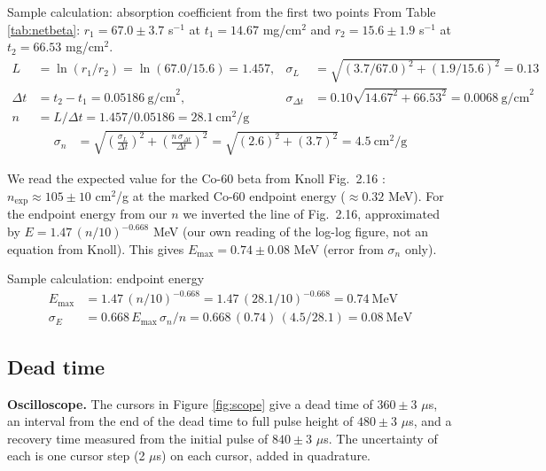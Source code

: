 \documentclass[12pt]{article}
\begin{document}
\begin{samplecalc}{Sample calculation: absorption coefficient from the first two points}
From Table \ref{tab:netbeta}: $r_1 = 67.0 \pm 3.7$ s$^{-1}$ at $t_1 = 14.67$ mg/cm$^2$ and $r_2 = 15.6 \pm 1.9$ s$^{-1}$ at $t_2 = 66.53$ mg/cm$^2$.
\begin{align*}
L &= \ln(r_1/r_2) = \ln(67.0/15.6) = 1.457, &
\sigma_L &= \sqrt{(3.7/67.0)^2 + (1.9/15.6)^2} = 0.13\\
\Delta t &= t_2 - t_1 = 0.05186\ \text{g/cm}^2, &
\sigma_{\Delta t} &= 0.10\sqrt{14.67^2 + 66.53^2} = 0.0068\ \text{g/cm}^2\\
n &= L/\Delta t = 1.457/0.05186 = 28.1\ \text{cm}^2/\text{g}
\end{align*}
\begin{align*}
\sigma_n &= \sqrt{\left(\frac{\sigma_L}{\Delta t}\right)^2 + \left(\frac{n\,\sigma_{\Delta t}}{\Delta t}\right)^2}
 = \sqrt{(2.6)^2 + (3.7)^2} = 4.5\ \text{cm}^2/\text{g}
\end{align*}
\end{samplecalc}

We read the expected value for the Co-60 beta from Knoll Fig.\ 2.16 \cite{knoll}: $n_{\text{exp}} \approx 105 \pm 10$ cm$^2$/g at the marked Co-60 endpoint energy ($\approx 0.32$ MeV). For the endpoint energy from our $n$ we inverted the line of Fig.\ 2.16, approximated by $E = 1.47\,(n/10)^{-0.668}$ MeV (our own reading of the log-log figure, not an equation from Knoll). This gives $E_{\max} = 0.74 \pm 0.08$ MeV (error from $\sigma_n$ only).

\begin{samplecalc}{Sample calculation: endpoint energy}
\begin{align*}
E_{\max} &= 1.47\,(n/10)^{-0.668} = 1.47\,(28.1/10)^{-0.668} = 0.74\ \text{MeV}\\
\sigma_E &= 0.668\,E_{\max}\,\sigma_n/n = 0.668\,(0.74)\,(4.5/28.1) = 0.08\ \text{MeV}
\end{align*}
\end{samplecalc}

\subsection{Dead time}

\textbf{Oscilloscope.} The cursors in Figure \ref{fig:scope} give a dead time of $360 \pm 3$ $\mu$s, an interval from the end of the dead time to full pulse height of $480 \pm 3$ $\mu$s, and a recovery time measured from the initial pulse of $840 \pm 3$ $\mu$s. The uncertainty of each is one cursor step (2 $\mu$s) on each cursor, added in quadrature.
\end{document}
